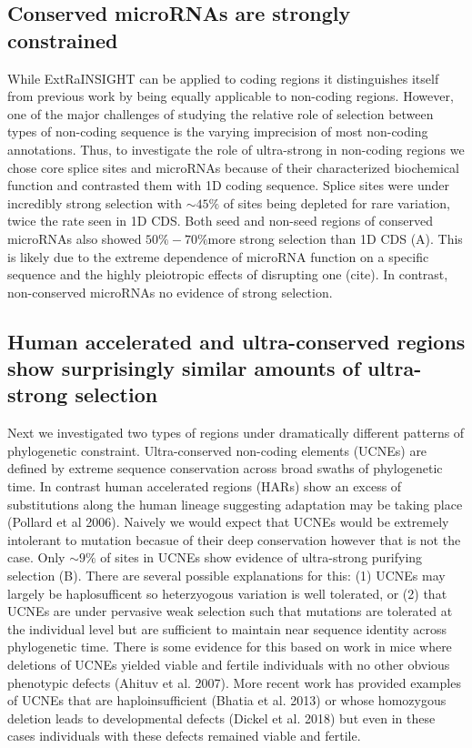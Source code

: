 \documentclass[11pt]{article}
\begin{document}
\subsection*{Conserved microRNAs are strongly constrained}
While ExtRaINSIGHT can be applied to coding regions it distinguishes itself from previous work by being equally applicable to non-coding regions. However, one of the major challenges of studying the relative role of selection between types of non-coding sequence is the varying imprecision of most non-coding annotations. Thus, to investigate the role of ultra-strong in non-coding regions we chose core splice sites and microRNAs because of their characterized biochemical function and contrasted them with 1D coding sequence. Splice sites were under incredibly strong selection with $\sim45\%$ of sites being depleted for rare variation, twice the rate seen in 1D CDS. Both seed and non-seed regions of conserved microRNAs also showed $50\%-70\%$more strong selection than 1D CDS (A). This is likely due to the extreme dependence of microRNA function on a specific sequence and the highly pleiotropic effects of disrupting one (cite). In contrast, non-conserved microRNAs no evidence of strong selection.

\subsection*{Human accelerated and ultra-conserved regions show surprisingly similar amounts of ultra-strong selection}

Next we investigated two types of regions under dramatically different patterns of phylogenetic constraint. Ultra-conserved non-coding elements (UCNEs) are defined by extreme sequence conservation across broad swaths of phylogenetic time. In contrast human accelerated regions (HARs) show an excess of substitutions along the human lineage suggesting adaptation may be taking place (Pollard et al 2006). Naively we would expect that UCNEs would be extremely intolerant to mutation becasue of their deep conservation however that is not the case. Only $\sim 9\%$ of sites in UCNEs show evidence of ultra-strong purifying selection (B). There are several possible explanations for this: (1) UCNEs may largely be haplosufficent so heterzyogous variation is well tolerated, or (2) that UCNEs are under pervasive weak selection such that mutations are tolerated at the individual level but are sufficient to maintain near sequence identity across phylogenetic time. There is some evidence for this based on work in mice where deletions of UCNEs yielded viable and fertile individuals with no other obvious phenotypic defects (Ahituv et al. 2007). More recent work has provided examples of UCNEs that are haploinsufficient (Bhatia et al. 2013) or whose homozygous deletion leads to developmental defects (Dickel et al. 2018) but even in these cases individuals with these defects remained viable and fertile.
\end{document}
